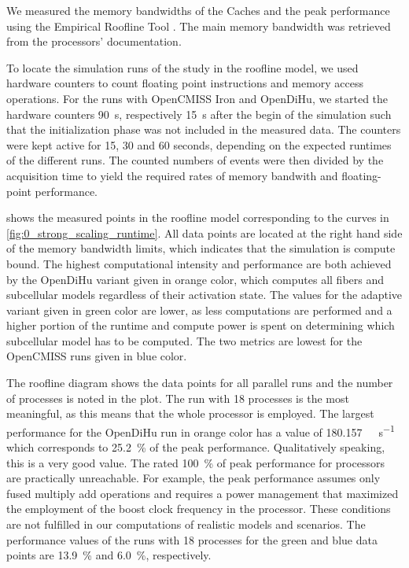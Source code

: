 We measured the memory bandwidths of the Caches and the peak performance using the Empirical Roofline Tool \cite{ert}. The main memory bandwidth was retrieved from the processors' documentation.

To locate the simulation runs of the study in the roofline model, we used hardware counters to count floating point instructions and memory access operations.
For the runs with OpenCMISS Iron and OpenDiHu, we started the hardware counters \SI{90}{\second}, respectively \SI{15}{\second} after the begin of the simulation such that the initialization phase was not included in the measured data. The counters were kept active for 15, 30 and 60 seconds, depending on the expected runtimes of the different runs. The counted numbers of events were then divided by the acquisition time to yield the required rates of memory bandwith and floating-point performance.

 shows the measured points in the roofline model corresponding to the curves in \cref{fig:0_strong_scaling_runtime}. All data points are located at the right hand side of the memory bandwidth limits, which indicates that the simulation is compute bound. 
The highest computational intensity and performance are both achieved by the OpenDiHu variant given in orange color, which computes all fibers and subcellular models regardless of their activation state. The values for the adaptive variant given in green color are lower, as less computations are performed and a higher portion of the runtime and compute power is spent on determining which subcellular model has to be computed. The two metrics are lowest for the OpenCMISS runs given in blue color.

The roofline diagram shows the data points for all parallel runs and the number of processes is noted in the plot. The run with 18 processes is the most meaningful, as this means that the whole processor is employed. The largest performance for the OpenDiHu run in orange color has a value of \SI{180.157}{\giga\flop\per\second} which corresponds to \SI{25.2}{\percent} of the peak performance. Qualitatively speaking, this is a very good value. The rated \SI{100}{\percent} of peak performance for processors are practically unreachable. For example, the peak performance assumes only fused multiply add operations and requires a power management that maximized the employment of the boost clock frequency in the processor. These conditions are not fulfilled in our computations of realistic models and scenarios.
The performance values of the runs with 18 processes for the green and blue data points are \SI{13.9}{\percent} and \SI{6.0}{\percent}, respectively. 

